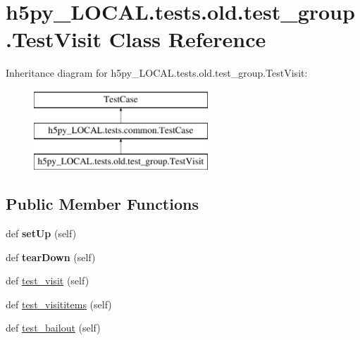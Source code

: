 \hypertarget{classh5py__LOCAL_1_1tests_1_1old_1_1test__group_1_1TestVisit}{}\section{h5py\+\_\+\+L\+O\+C\+A\+L.\+tests.\+old.\+test\+\_\+group.\+Test\+Visit Class Reference}
\label{classh5py__LOCAL_1_1tests_1_1old_1_1test__group_1_1TestVisit}
Inheritance diagram for h5py\+\_\+\+L\+O\+C\+A\+L.\+tests.\+old.\+test\+\_\+group.\+Test\+Visit\+:\begin{figure}[H]
\begin{center}
\leavevmode
\includegraphics[height=3.000000cm]{classh5py__LOCAL_1_1tests_1_1old_1_1test__group_1_1TestVisit}
\end{center}
\end{figure}
\subsection*{Public Member Functions}
\begin{DoxyCompactItemize}
\item 
\mbox{\label{classh5py__LOCAL_1_1tests_1_1old_1_1test__group_1_1TestVisit_a0959ae807b1502e829f8ffb9070810e9}} 
def {\bfseries set\+Up} (self)
\item 
\mbox{\label{classh5py__LOCAL_1_1tests_1_1old_1_1test__group_1_1TestVisit_aabde88b823836b062ce232df87e47fa5}} 
def {\bfseries tear\+Down} (self)
\item 
def \hyperlink{classh5py__LOCAL_1_1tests_1_1old_1_1test__group_1_1TestVisit_acebf46581da6e70f50a98d2cfd7f2b95}{test\+\_\+visit} (self)
\item 
def \hyperlink{classh5py__LOCAL_1_1tests_1_1old_1_1test__group_1_1TestVisit_ad4cac17ee66bf76546430210798a0d88}{test\+\_\+visititems} (self)
\item 
def \hyperlink{classh5py__LOCAL_1_1tests_1_1old_1_1test__group_1_1TestVisit_a4fdd9182b725b515dff5b010011ffea3}{test\+\_\+bailout} (self)
\end{DoxyCompactItemize}

